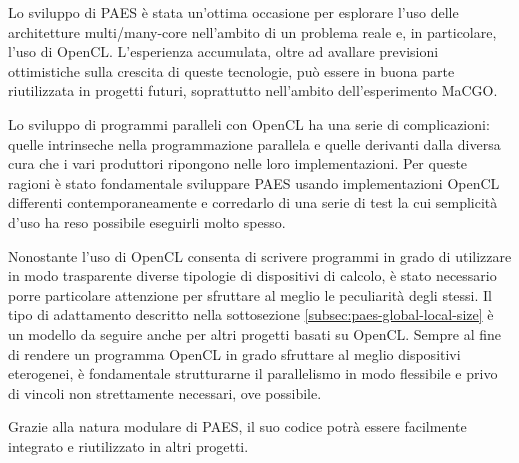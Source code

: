 \documentclass[12pt,a4paper,oneside]{book}
\begin{document}
Lo sviluppo di PAES è stata un'ottima occasione per esplorare l'uso delle architetture multi/many-core nell'ambito di un problema reale e, in particolare, l'uso di \ac{OpenCL}. L'esperienza accumulata, oltre ad avallare previsioni ottimistiche sulla crescita di queste tecnologie, può essere in buona parte riutilizzata in progetti futuri, soprattutto nell'ambito dell'esperimento \ac{MaCGO}.

Lo sviluppo di programmi paralleli con \ac{OpenCL} ha una serie di complicazioni: quelle intrinseche nella programmazione parallela e quelle derivanti dalla diversa cura che i vari produttori ripongono nelle loro implementazioni. Per queste ragioni è stato fondamentale sviluppare PAES usando implementazioni \ac{OpenCL} differenti contemporaneamente e corredarlo di una serie di test la cui semplicità d'uso ha reso possibile eseguirli molto spesso.

Nonostante l'uso di \ac{OpenCL} consenta di scrivere programmi in grado di utilizzare in modo trasparente diverse tipologie di dispositivi di calcolo, è stato necessario porre particolare attenzione per sfruttare al meglio le peculiarità degli stessi. Il tipo di adattamento descritto nella sottosezione \ref{subsec:paes-global-local-size} è un modello da seguire anche per altri progetti basati su \ac{OpenCL}. Sempre al fine di rendere un programma \ac{OpenCL} in grado sfruttare al meglio dispositivi eterogenei, è fondamentale strutturarne il parallelismo in modo flessibile e privo di vincoli non strettamente necessari, ove possibile.

Grazie alla natura modulare di PAES, il suo codice potrà essere facilmente integrato e riutilizzato in altri progetti.

\newpage
{}
{}


\listoftables
\lstlistoflistings
\listoffigures
\end{document}
